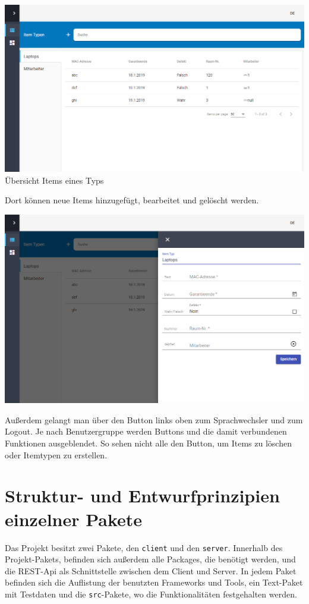 \documentclass[11pt,a4paper]{report}
\begin{document}
	\begin{center}
		\includegraphics[scale=0.3]{uebersicht.png}\\
		Übersicht Items eines Typs\\
	\end{center}
	
	Dort können neue Items hinzugefügt, bearbeitet und gelöscht werden.\\
	
	\begin{center}
		\includegraphics[scale=0.3]{eigenschaften.png}\\
	\end{center}
	
	Außerdem gelangt man über den Button links oben zum Sprachwechsler und zum Logout.
	Je nach Benutzergruppe werden Buttons und die damit verbundenen Funktionen ausgeblendet.
	So sehen nicht alle den Button, um Items zu löschen oder Itemtypen zu erstellen.
	
	\section{Struktur- und Entwurfprinzipien einzelner Pakete}
	Das Projekt besitzt zwei Pakete, den \texttt{client} und den \texttt{server}. 
	Innerhalb des Projekt-Pakets, befinden sich außerdem alle Packages, die benötigt werden, und die REST-Api als Schnittstelle zwischen dem Client und Server. 
	In jedem Paket befinden sich die Auflistung der benutzten Frameworks und Tools, ein Text-Paket mit Testdaten und die \texttt{src}-Pakete, wo die Funktionalitäten festgehalten werden.
	
\end{document}
